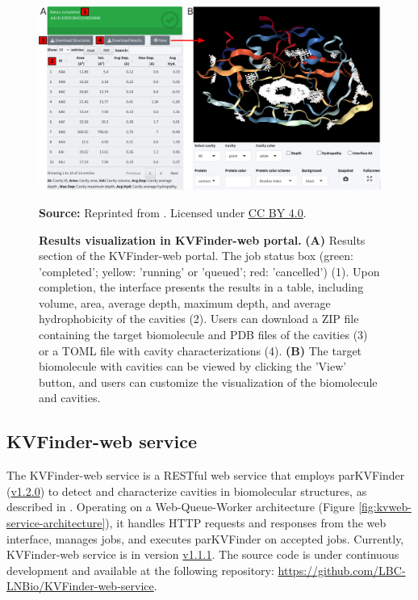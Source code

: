 \documentclass[Ingles]{phdthesis}
\begin{document}
\begin{figure}[h]
  \centering
  \includegraphics[scale=1.8]{images/kvweb-results.png}
  \centerline{\tiny{\textbf{Source:} Reprinted from \cite{guerra2023A}. Licensed under \href{https://creativecommons.org/licenses/by/4.0/}{CC BY 4.0}.}}
  \caption[Results visualization in KVFinder-web portal]{\textbf{Results visualization in KVFinder-web portal.} \textbf{(A)} Results section of the KVFinder-web portal. The job status box (green: 'completed'; yellow: 'running' or 'queued'; red: 'cancelled') (1). Upon completion, the interface presents the results in a table, including volume, area, average depth, maximum depth, and average hydrophobicity of the cavities (2). Users can download a ZIP file containing the target biomolecule and PDB files of the cavities (3) or a TOML file with cavity characterizations (4). \textbf{(B)} The target biomolecule with cavities can be viewed by clicking the 'View' button, and users can customize the visualization of the biomolecule and cavities.}
  \label{fig:kvweb-results}
\end{figure}

\subsection{KVFinder-web service}

The KVFinder-web service is a RESTful web service that employs parKVFinder (\href{https://github.com/LBC-LNBio/parKVFinder/releases/tag/v1.2.0}{v1.2.0}) to detect and characterize cavities in biomolecular structures, as described in \cite{guerra2019,guerra2020,guerra2023A}. Operating on a Web-Queue-Worker architecture (Figure \ref{fig:kvweb-service-architecture}), it handles HTTP requests and responses from the web interface, manages jobs, and executes parKVFinder on accepted jobs. Currently, KVFinder-web service is in version \href{https://github.com/LBC-LNBio/KVFinder-web-service/releases/tag/v1.1.1}{v1.1.1}. The source code is under continuous development and available at the following repository: \url{https://github.com/LBC-LNBio/KVFinder-web-service}.
\end{document}
